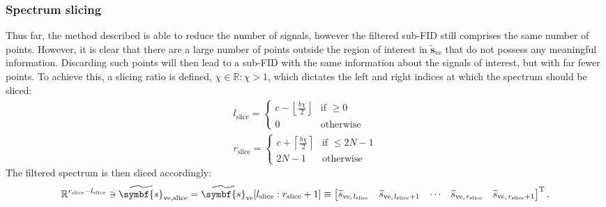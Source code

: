 \subsubsection{Spectrum slicing}
Thus far, the method described is able to reduce the number of signals,
however the filtered sub-\ac{FID} still comprises the same number of points.
However, it is clear that there are a large number of points outside the region
of interest in $\widetilde{\symbf{s}}_{\text{ve}}$ that do not possess any
meaningful information. Discarding such points will then lead to a sub-\ac{FID}
with the same information about the signals of interest, but with far
fewer points. To achieve this, a slicing ratio is defined, $\chi \in
\mathbb{R}: \chi> 1$, which dictates the left and right indices at which the
spectrum should be sliced:
\begin{subequations}
    \begin{gather}
        l_{\text{slice}} =
        \begin{cases}
            c - \left \lfloor \frac{b \chi}{2} \right \rfloor &
            \text{if } \geq 0 \\
            0 & \text{otherwise}
        \end{cases} \\
        r_{\text{slice}} =
        \begin{cases}
            c + \left \lceil \frac{b \chi}{2} \right \rceil &
            \text{if } \leq 2N - 1 \\
            2N - 1 & \text{otherwise}
        \end{cases}
    \end{gather}
\end{subequations}
The filtered spectrum is then sliced accordingly:
\begin{equation}
    \mathbb{R}^{r_{\text{slice}} - l_{\text{slice}}} \ni
    \widetilde{\symbf{s}}_{\text{ve,slice}} =
    \widetilde{\symbf{s}}_{\text{ve}}[l_{\text{slice}} : r_{\text{slice}} + 1] \equiv
    \begin{bmatrix}
        \widetilde{s}_{\text{ve},\hspace*{1pt}l_{\text{slice}}} &
        \widetilde{s}_{\text{ve},\hspace*{1pt}l_{\text{slice}} + 1} &
        \cdots &
        \widetilde{s}_{\text{ve},\hspace*{1pt}r_{\text{slice}}} &
        \widetilde{s}_{\text{ve},\hspace*{1pt}r_{\text{slice}} + 1}
    \end{bmatrix}\T.
\end{equation}
